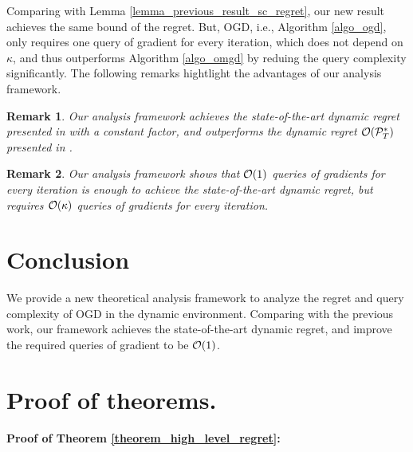 \documentclass[journal]{IEEEtran}
\newtheorem{Remark}{\bf{Remark}}
\begin{document}
Comparing with Lemma \ref{lemma_previous_result_sc_regret}, our new result achieves the same bound of the regret. But, OGD, i.e., Algorithm \ref{algo_ogd}, only requires one query of gradient for every iteration, which does not depend on $\kappa$, and thus outperforms Algorithm \ref{algo_omgd} by reduing the query complexity significantly. The following remarks hightlight the advantages of our analysis framework.
\begin{Remark}
Our analysis framework achieves the state-of-the-art dynamic regret presented in \cite{Zhang:2016wl} with a constant factor, and outperforms the dynamic regret ${\mathcal{O}}({\mathcal{P}}_T^{\ast})$ presented in \cite{Mokhtari:2016jz}. 
\end{Remark}
\begin{Remark}
Our analysis framework shows that ${\mathcal{O}}(1)$ queries of gradients for every iteration is enough to achieve the state-of-the-art dynamic regret, but \cite{Zhang:2016wl} requires ${\mathcal{O}}(\kappa)$ queries of gradients for every iteration.
\end{Remark}



\section{Conclusion}
\label{sect_conclude}
We provide a new theoretical analysis framework to analyze the regret and query complexity of OGD in the dynamic environment. Comparing with the previous work, our framework achieves the state-of-the-art dynamic regret, and improve the required queries of gradient to be ${\mathcal{O}}(1)$. 






\appendix

\section*{Proof of theorems.}

\textbf{Proof of Theorem \ref{theorem_high_level_regret}:}
\end{document}

